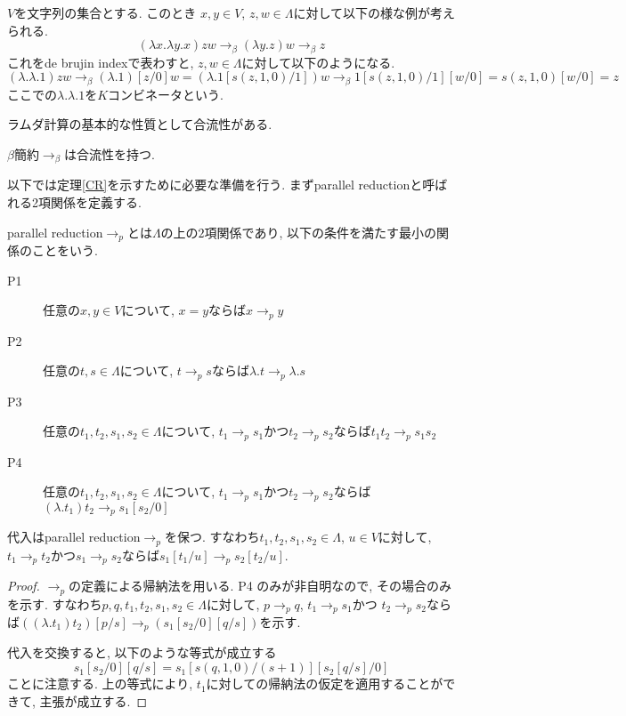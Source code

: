 \documentclass{ltjsarticle}
\begin{document}
\begin{ex}[$K$ コンビネータ]
 $V$を文字列の集合とする. このとき $x, y \in V$, $z, w \in \Lambda$に対して以下の様な例が考えられる.
 \[
 (\lambda x. \lambda y. x) z w \rightarrow_{\beta} (\lambda y. z) w \rightarrow_{\beta} z
 \]
 これをde brujin indexで表わすと, $z, w \in \Lambda$に対して以下のようになる.
 \[
 (\lambda. \lambda. 1) z w \rightarrow_{\beta} (\lambda. 1)[z/0] w = (\lambda. 1[s (z, 1, 0)/1]) w \rightarrow_{\beta} 1[s (z, 1, 0)/1][w/0] = s (z, 1, 0)[w/0] = z
 \]
ここでの$\lambda. \lambda. 1$を$K$コンビネータという.
\end{ex}

ラムダ計算の基本的な性質として合流性がある.

\begin{thm}\label{CR}
 $\beta$簡約$\rightarrow_{\beta}$は合流性を持つ.
\end{thm}

以下では定理\ref{CR}を示すために必要な準備を行う. まずparallel reductionと呼ばれる2項関係を定義する.

\begin{defn}
 parallel reduction$\rightarrow_{p}$とは$\Lambda$の上の$2$項関係であり, 以下の条件を満たす最小の関係のことをいう.
 \begin{description}
  \item[P1] 任意の$x, y \in V$について, $x = y$ならば$x \rightarrow_{p} y$
  \item[P2] 任意の$t, s \in \Lambda$について, $t \rightarrow_{p} s$ならば$\lambda. t \rightarrow_{p} \lambda. s$
  \item[P3] 任意の$t_1, t_2, s_1, s_2 \in \Lambda$について,
        $t_1 \rightarrow_{p} s_1$かつ$t_2 \rightarrow_{p} s_2$ならば$t_1 t_2 \rightarrow_{p} s_1 s_2$
  \item[P4] 任意の$t_1, t_2, s_1, s_2 \in \Lambda$について,
        $t_1 \rightarrow_{p} s_1$かつ$t_2 \rightarrow_{p} s_2$ならば$(\lambda. t_1) t_2 \rightarrow_{p} s_1[s_2/0]$
 \end{description}
\end{defn}

\begin{lem}\label{spp}
 代入はparallel reduction$\rightarrow_{p}$を保つ. すなわち$t_1, t_2, s_1, s_2 \in \Lambda$, $u \in V$に対して, $t_1 \rightarrow_{p} t_2$かつ$s_1 \rightarrow_{p} s_2$ならば$s_1[t_1/u] \rightarrow_{p} s_2[t_2/u]$.
\end{lem}

\begin{proof}
 $\rightarrow_{p}$の定義による帰納法を用いる. P4%
のみが非自明なので, その場合のみを示す.
 すなわち$p, q, t_1, t_2, s_1, s_2 \in \Lambda$に対して,
$p \rightarrow_{p} q$, $t_1 \rightarrow_{p} s_1$かつ $t_2 \rightarrow_{p} s_2$ならば$((\lambda. t_1) t_2) [p / s] \rightarrow_{p} (s_1 [s_2 / 0] [q / s])$を示す.
 
 代入を交換すると, 以下のような等式が成立する
 \[
 s_1 [s_2 / 0][q / s] = s_1 [s(q, 1, 0) / (s + 1)][s_2 [q / s] / 0]
 \]
 ことに注意する. 上の等式により, $t_1$に対しての帰納法の仮定を適用することができて, 主張が成立する.
\end{proof}
\end{document}

